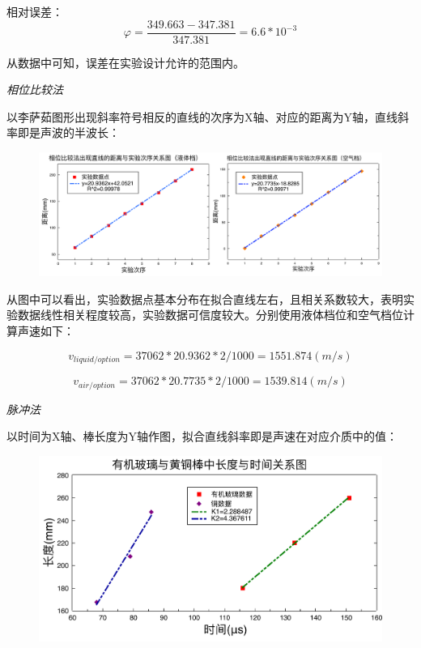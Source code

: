 \documentclass[UTF8]{ctexart}
\begin{document}
    相对误差：
    \begin{equation*}
        \varphi =\frac{349.663-347.381}{347.381}=6.6*10^{-3}
    \end{equation*}

    从数据中可知，误差在实验设计允许的范围内。


    \begin{center}
        \emph{相位比较法}
    \end{center}

    以李萨茹图形出现斜率符号相反的直线的次序为X轴、对应的距离为Y轴，直线斜率即是声波的半波长：

    \begin{figure}[ht]
        \centering 
        \includegraphics[width=17cm]{相位比较.pdf}
    \end{figure}

    从图中可以看出，实验数据点基本分布在拟合直线左右，且相关系数较大，表明实验数据线性相关程度较高，实验数据可信度较大。分别使用液体档位和空气档位计算声速如下：

    \begin{equation*}
        v_{liquid/option}=37062*20.9362*2/1000=1551.874(m/s)
    \end{equation*}

    \begin{equation*}
        v_{air/option}=37062*20.7735*2/1000=1539.814(m/s)
    \end{equation*}


    \begin{center}
        \emph{脉冲法}\\[0.4cm]
    \end{center}

    以时间为X轴、棒长度为Y轴作图，拟合直线斜率即是声速在对应介质中的值：

    \begin{figure}[ht]
        \centering 
        \includegraphics[width=15cm]{设计实验.pdf}
    \end{figure}
\end{document}
